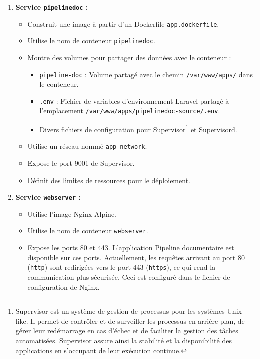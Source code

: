 \begin{enumerate}
    \item \cprotect\textbf{Service \Verb|pipelinedoc| :}
          \begin{itemize}
              \item Construit une image à partir d'un Dockerfile \Verb|app.dockerfile|.
              \item Utilise le nom de conteneur \Verb|pipelinedoc|.
              \item Montre des volumes pour partager des données avec le conteneur :
                    \begin{itemize}
                        \item \Verb|pipeline-doc| : Volume partagé avec le chemin \Verb|/var/www/apps/| dans le conteneur.
                        \item \Verb|.env| : Fichier de variables d'environnement Laravel partagé à l'emplacement \Verb|/var/www/apps/pipelinedoc-source/.env|.
                        \item Divers fichiers de configuration pour Supervisor\footnote{Supervisor est un système de gestion de processus pour les systèmes Unix-like. Il permet de contrôler et de surveiller les processus en arrière-plan, de gérer leur redémarrage en cas d'échec et de faciliter la gestion des tâches automatisées. Supervisor assure ainsi la stabilité et la disponibilité des applications en s'occupant de leur exécution continue.} et Supervisord.
                    \end{itemize}
              \item Utilise un réseau nommé \Verb|app-network|.
              \item Expose le port 9001 de Supervisor.
              \item Définit des limites de ressources pour le déploiement.
          \end{itemize}
    \item \cprotect\textbf{Service \Verb|webserver| :}
          \begin{itemize}
              \item Utilise l'image Nginx Alpine.
              \item Utilise le nom de conteneur \Verb|webserver|.
              \item Expose les ports 80 et 443. L'application Pipeline documentaire est disponible sur ces ports. Actuellement, les requêtes arrivant au port 80 (\Verb|http|) sont redirigées vers le port 443 (\Verb|https|), ce qui rend la communication plus sécurisée. Ceci est configuré dans le fichier de configuration de Nginx.

\end{itemize}
\end{enumerate}
